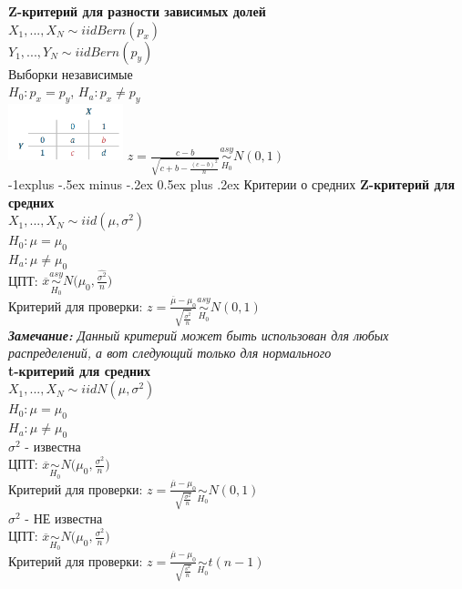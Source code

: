 \documentclass[10pt,landscape]{article}
\makeatletter
\renewcommand{\subsection}{\@startsection{subsection}{2}{0mm}%
                                {-1explus -.5ex minus -.2ex}%
                                {0.5ex plus .2ex}%
                                {\normalfont\normalsize\bfseries}}
\makeatother
\begin{document}
\begin{multicols}{3}
\textbf{Z-критерий для разности зависимых долей}\\
$X_1, ... , X_N \sim iid Bern(p_x)$\\
$Y_1, ... , Y_N \sim iid Bern(p_y)$\\
Выборки независимые\\
$H_0: p_x = p_y$, $H_a: p_x \neq p_y$\\
\includegraphics[width=0.25\textwidth]{Screenshot from 2021-09-03 12-13-14.png}
$z = \frac{c - b}{\sqrt{ c + b  - \frac{(c-b)^2}{n}}}\underset{H_0}{\overset{asy}{\sim}} N(0,1)$\\

\subsection{Критерии о средних}
\textbf{Z-критерий для средних}\\
$X_1, ... , X_N \sim iid (\mu, \sigma^2)$\\
$H_0 : \mu = \mu_0$\\
$H_a : \mu \neq \mu_0$\\
ЦПТ: 
$\overline{x} \underset{H_0}{\overset{asy}{\sim}} N\Big(\mu_0, \frac{\hat{\sigma^2}}{n}\Big)$\\
Критерий для проверки: $z = \frac{\overline{\mu}-\mu_0}{\sqrt{\frac{\hat{\sigma^2}}{n}}}\underset{H_0}{\overset{asy}{\sim}} N(0,1) $\\
\textit{\textbf{Замечание:} Данный критерий может быть использован для любых распределений, а вот следующий только для нормального}\\ 
\textbf{t-критерий для средних}\\
$X_1, ... , X_N \sim iid N(\mu, \sigma^2)$\\
$H_0 : \mu = \mu_0$\\
$H_a : \mu \neq \mu_0$\\
$\sigma^2$ - известна\\
ЦПТ: 
$\overline{x} \underset{H_0}{\sim} N\Big(\mu_0, \frac{\sigma^2}{n}\Big)$\\
Критерий для проверки: $z = \frac{\overline{\mu}-\mu_0}{\sqrt{\frac{\sigma^2}{n}}}\underset{H_0}{\sim} N(0,1) $\\


$\sigma^2$ - НЕ известна\\
ЦПТ: 
$\overline{x} \underset{H_0}{\sim} N\Big(\mu_0, \frac{\sigma^2}{n}\Big)$\\
Критерий для проверки: $z = \frac{\overline{\mu}-\mu_0}{\sqrt{\frac{s^2}{n}}}\underset{H_0}{\sim} t(n-1) $\\


\end{multicols}
\end{document}
